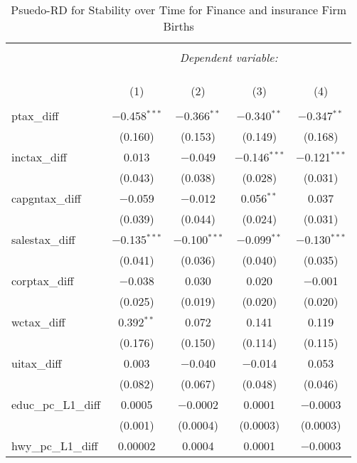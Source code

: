 
\begin{table}[!htbp] \centering 
  \caption{Psuedo-RD for Stability over Time for  Finance and insurance Firm Births} 
  \label{} 
\begin{tabular}{@{\extracolsep{5pt}}lcccc} 
\\[-1.8ex]\hline 
\hline \\[-1.8ex] 
 & \multicolumn{4}{c}{\textit{Dependent variable:}} \\ 
\cline{2-5} 
\\[-1.8ex] & \multicolumn{4}{c}{ } \\ 
\\[-1.8ex] & (1) & (2) & (3) & (4)\\ 
\hline \\[-1.8ex] 
 ptax\_diff & $-$0.458$^{***}$ & $-$0.366$^{**}$ & $-$0.340$^{**}$ & $-$0.347$^{**}$ \\ 
  & (0.160) & (0.153) & (0.149) & (0.168) \\ 
  inctax\_diff & 0.013 & $-$0.049 & $-$0.146$^{***}$ & $-$0.121$^{***}$ \\ 
  & (0.043) & (0.038) & (0.028) & (0.031) \\ 
  capgntax\_diff & $-$0.059 & $-$0.012 & 0.056$^{**}$ & 0.037 \\ 
  & (0.039) & (0.044) & (0.024) & (0.031) \\ 
  salestax\_diff & $-$0.135$^{***}$ & $-$0.100$^{***}$ & $-$0.099$^{**}$ & $-$0.130$^{***}$ \\ 
  & (0.041) & (0.036) & (0.040) & (0.035) \\ 
  corptax\_diff & $-$0.038 & 0.030 & 0.020 & $-$0.001 \\ 
  & (0.025) & (0.019) & (0.020) & (0.020) \\ 
  wctax\_diff & 0.392$^{**}$ & 0.072 & 0.141 & 0.119 \\ 
  & (0.176) & (0.150) & (0.114) & (0.115) \\ 
  uitax\_diff & 0.003 & $-$0.040 & $-$0.014 & 0.053 \\ 
  & (0.082) & (0.067) & (0.048) & (0.046) \\ 
  educ\_pc\_L1\_diff & 0.0005 & $-$0.0002 & 0.0001 & $-$0.0003 \\ 
  & (0.001) & (0.0004) & (0.0003) & (0.0003) \\ 
  hwy\_pc\_L1\_diff & 0.00002 & 0.0004 & 0.0001 & $-$0.0003 \\ 

\end{tabular}
\end{table}
